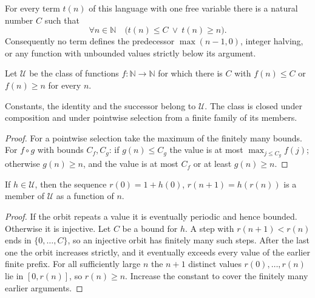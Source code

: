 \begin{theorem}\label{ctr:thm:unary}
For every term $t(n)$ of this language with one free variable there is a natural number $C$
such that
\[
 \forall n\in\mathbb N\quad\bigl(t(n)\le C\ \lor\ t(n)\ge n\bigr).
\]
Consequently no term defines the predecessor $\max(n-1,0)$, integer halving, or any function
with unbounded values strictly below its argument.
\end{theorem}

Let $\mathcal U$ be the class of functions $f\colon\mathbb N\to\mathbb N$ for which there is
$C$ with $f(n)\le C$ or $f(n)\ge n$ for every $n$.

\begin{lemma}[Closure]\label{ctr:lem:Uclosure}
Constants, the identity and the successor belong to $\mathcal U$. The class is closed under
composition and under pointwise selection from a finite family of its members.
\end{lemma}
\begin{proof}
For a pointwise selection take the maximum of the finitely many bounds. For $f\circ g$ with
bounds $C_f,C_g$: if $g(n)\le C_g$ the value is at most $\max_{j\le C_g}f(j)$; otherwise
$g(n)\ge n$, and the value is at most $C_f$ or at least $g(n)\ge n$.
\end{proof}

\begin{lemma}[Orbits]\label{ctr:lem:orbit}
If $h\in\mathcal U$, then the sequence $r(0)=1+h(0)$, $r(n+1)=h(r(n))$ is a member of
$\mathcal U$ as a function of $n$.
\end{lemma}
\begin{proof}
If the orbit repeats a value it is eventually periodic and hence bounded. Otherwise it is
injective. Let $C$ be a bound for $h$. A step with $r(n+1)<r(n)$ ends in $\{0,\dots,C\}$,
so an injective orbit has finitely many such steps. After the last one the orbit increases
strictly, and it eventually exceeds every value of the earlier finite prefix. For all
sufficiently large $n$ the $n+1$ distinct values $r(0),\dots,r(n)$ lie in $[0,r(n)]$, so
$r(n)\ge n$. Increase the constant to cover the finitely many earlier arguments.
\end{proof}

